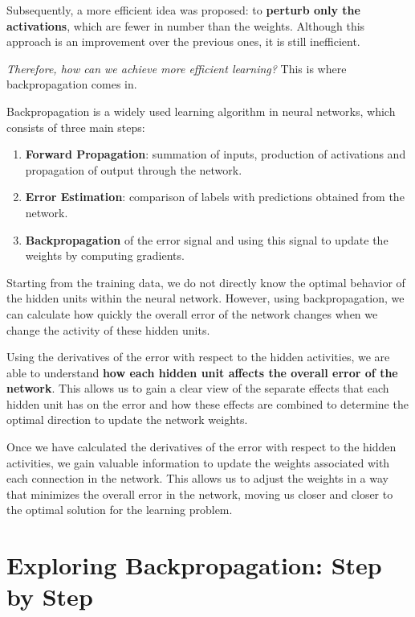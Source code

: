 Subsequently, a more efficient idea was proposed: to \textbf{perturb only the activations}, which are fewer in number than the weights. Although this approach is an improvement over the previous ones, it is still inefficient.

\textit{Therefore, how can we achieve more efficient learning?} This is where backpropagation comes in.

\begin{remark}
Backpropagation is a widely used learning algorithm in neural networks, which consists of three main steps:

\begin{enumerate}
    \item \textbf{Forward Propagation}: summation of inputs, production of activations and propagation of output through the network.

    \item \textbf{Error Estimation}: comparison of labels with predictions obtained from the network.

    \item \textbf{Backpropagation} of the error signal and using this signal to update the weights by computing gradients.
\end{enumerate}
\end{remark}

Starting from the training data, we do not directly know the optimal behavior of the hidden units within the neural network. However, using backpropagation, we can calculate how quickly the overall error of the network changes when we change the activity of these hidden units.

Using the derivatives of the error with respect to the hidden activities, we are able to understand \textbf{how each hidden unit affects the overall error of the network}. This allows us to gain a clear view of the separate effects that each hidden unit has on the error and how these effects are combined to determine the optimal direction to update the network weights.

Once we have calculated the derivatives of the error with respect to the hidden activities, we gain valuable information to update the weights associated with each connection in the network. This allows us to adjust the weights in a way that minimizes the overall error in the network, moving us closer and closer to the optimal solution for the learning problem.

\section{Exploring Backpropagation: Step by Step}

